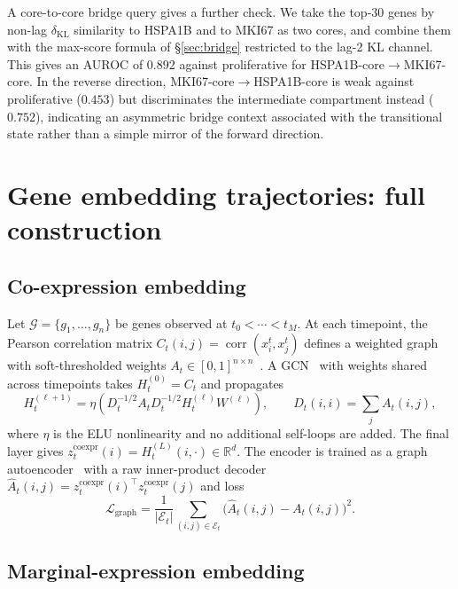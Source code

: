 \documentclass[10pt, letterpaper]{article}
\newcommand{\zco}{z^{\mathrm{coexpr}}}
\begin{document}
A core-to-core bridge query gives a further check. We take the top-30 genes by non-lag $\delta_{\mathrm{KL}}$ similarity to HSPA1B and to MKI67 as two cores, and combine them with the max-score formula of \S\ref{sec:bridge} restricted to the lag-2 KL channel. This gives an AUROC of $0.892$ against proliferative for HSPA1B-core$\to$MKI67-core. In the reverse direction, MKI67-core$\to$HSPA1B-core is weak against proliferative ($0.453$) but discriminates the intermediate compartment instead ($0.752$), indicating an asymmetric bridge context associated with the transitional state rather than a simple mirror of the forward direction.


\section{Gene embedding trajectories: full construction}
\label{app:embedding}

\subsection*{Co-expression embedding}

Let $\mathcal{G}=\{g_1,\ldots,g_n\}$ be genes observed at $t_0<\cdots<t_M$. At each timepoint, the Pearson correlation matrix $C_t(i,j)=\operatorname{corr}(x_i^t,x_j^t)$ defines a weighted graph with soft-thresholded weights $A_t\in[0,1]^{n\times n}$~\cite{langfelder2008wgcna}. A GCN~\cite{kipf2017gcn} with weights shared across timepoints takes $H_t^{(0)}=C_t$ and propagates
\[
H_t^{(\ell+1)}=\eta\!\left(D_t^{-1/2}A_tD_t^{-1/2}H_t^{(\ell)}W^{(\ell)}\right),\qquad D_t(i,i)=\sum_jA_t(i,j),
\]
where $\eta$ is the ELU nonlinearity and no additional self-loops are added. The final layer gives $\zco_t(i)=H_t^{(L)}(i,\cdot)\in\mathbb{R}^d$. The encoder is trained as a graph autoencoder~\cite{kipf2016vgae} with a raw inner-product decoder $\widehat{A}_t(i,j)=\zco_t(i)^\top\zco_t(j)$ and loss
\[
\mathcal{L}_{\mathrm{graph}}=\frac{1}{|\mathcal{E}_t|}\sum_{(i,j)\in\mathcal{E}_t}\big(\widehat{A}_t(i,j)-A_t(i,j)\big)^2 .
\]

\subsection*{Marginal-expression embedding}
\end{document}
